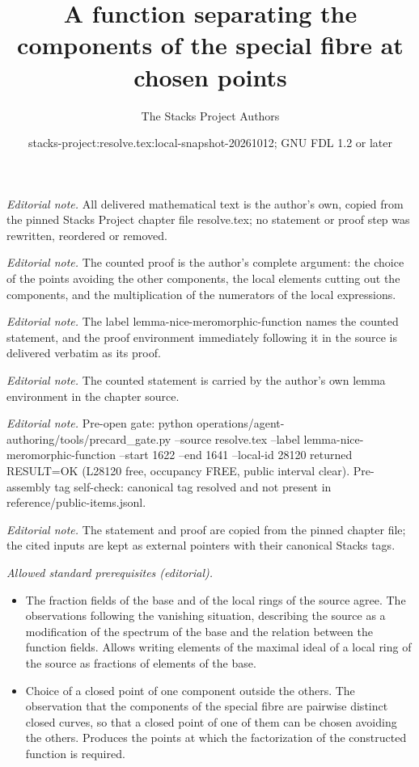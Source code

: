 \documentclass[10pt,a4paper]{amsart}
\title{A function separating the components of the special fibre at chosen points}
\author{The Stacks Project Authors}
\date{stacks-project:resolve.tex:local-snapshot-20261012; GNU FDL 1.2 or later}
\theoremstyle{plain}
\theoremstyle{definition}
\theoremstyle{remark}
\numberwithin{equation}{subsection}
\begin{document}
\maketitle
\noindent\textit{Editorial note.} All delivered mathematical text is the author's own, copied from the pinned Stacks Project chapter file resolve.tex; no statement or proof step was rewritten, reordered or removed.\par\medskip
\noindent\textit{Editorial note.} The counted proof is the author's complete argument: the choice of the points avoiding the other components, the local elements cutting out the components, and the multiplication of the numerators of the local expressions.\par\medskip
\noindent\textit{Editorial note.} The label lemma-nice-meromorphic-function names the counted statement, and the proof environment immediately following it in the source is delivered verbatim as its proof.\par\medskip
\noindent\textit{Editorial note.} The counted statement is carried by the author's own lemma environment in the chapter source.\par\medskip
\noindent\textit{Editorial note.} Pre-open gate: python operations/agent-authoring/tools/precard\_gate.py --source resolve.tex --label lemma-nice-meromorphic-function --start 1622 --end 1641 --local-id 28120 returned RESULT=OK (L28120 free, occupancy FREE, public interval clear). Pre-assembly tag self-check: canonical tag resolved and not present in reference/public-items.jsonl.\par\medskip
\noindent\textit{Editorial note.} The statement and proof are copied from the pinned chapter file; the cited inputs are kept as external pointers with their canonical Stacks tags.\par\medskip
\noindent\textit{Allowed standard prerequisites (editorial).}\begin{itemize}
\item The fraction fields of the base and of the local rings of the source agree. The observations following the vanishing situation, describing the source as a modification of the spectrum of the base and the relation between the function fields. Allows writing elements of the maximal ideal of a local ring of the source as fractions of elements of the base.
\item Choice of a closed point of one component outside the others. The observation that the components of the special fibre are pairwise distinct closed curves, so that a closed point of one of them can be chosen avoiding the others. Produces the points at which the factorization of the constructed function is required.
\end{itemize}\medskip
\end{document}
